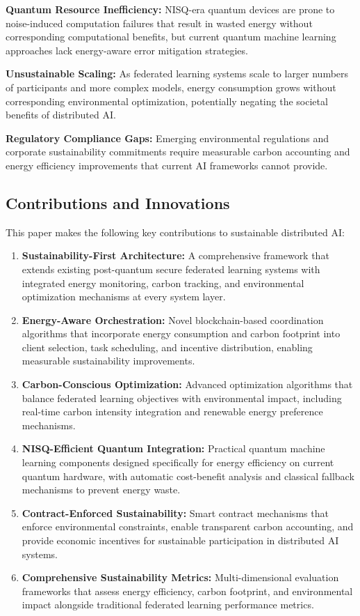 \documentclass[10pt,journal,compsoc]{IEEEtran}
\begin{document}
\textbf{Quantum Resource Inefficiency:} NISQ-era quantum devices are prone to noise-induced computation failures that result in wasted energy without corresponding computational benefits, but current quantum machine learning approaches lack energy-aware error mitigation strategies.

\textbf{Unsustainable Scaling:} As federated learning systems scale to larger numbers of participants and more complex models, energy consumption grows without corresponding environmental optimization, potentially negating the societal benefits of distributed AI.

\textbf{Regulatory Compliance Gaps:} Emerging environmental regulations and corporate sustainability commitments require measurable carbon accounting and energy efficiency improvements that current AI frameworks cannot provide.

\subsection{Contributions and Innovations}

This paper makes the following key contributions to sustainable distributed AI:

\begin{enumerate}
\item \textbf{Sustainability-First Architecture:} A comprehensive framework that extends existing post-quantum secure federated learning systems with integrated energy monitoring, carbon tracking, and environmental optimization mechanisms at every system layer.

\item \textbf{Energy-Aware Orchestration:} Novel blockchain-based coordination algorithms that incorporate energy consumption and carbon footprint into client selection, task scheduling, and incentive distribution, enabling measurable sustainability improvements.

\item \textbf{Carbon-Conscious Optimization:} Advanced optimization algorithms that balance federated learning objectives with environmental impact, including real-time carbon intensity integration and renewable energy preference mechanisms.

\item \textbf{NISQ-Efficient Quantum Integration:} Practical quantum machine learning components designed specifically for energy efficiency on current quantum hardware, with automatic cost-benefit analysis and classical fallback mechanisms to prevent energy waste.

\item \textbf{Contract-Enforced Sustainability:} Smart contract mechanisms that enforce environmental constraints, enable transparent carbon accounting, and provide economic incentives for sustainable participation in distributed AI systems.

\item \textbf{Comprehensive Sustainability Metrics:} Multi-dimensional evaluation frameworks that assess energy efficiency, carbon footprint, and environmental impact alongside traditional federated learning performance metrics.
\end{enumerate}
\end{document}
